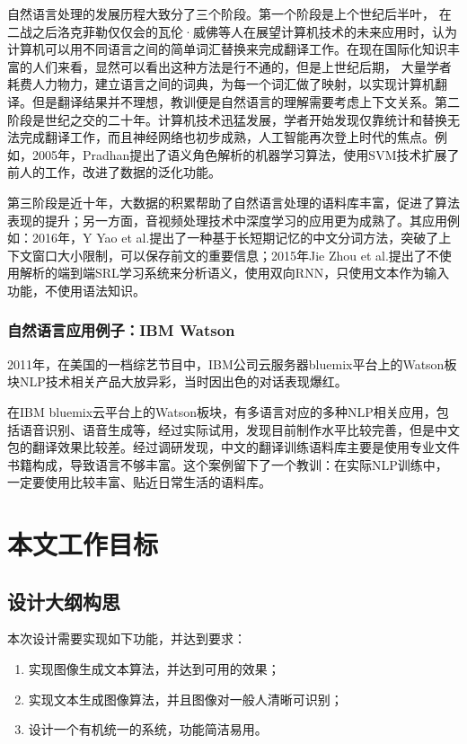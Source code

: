 自然语言处理的发展历程大致分了三个阶段。第一个阶段是上个世纪后半叶，
在二战之后洛克菲勒仅仅会的瓦伦·威佛等人在展望计算机技术的未来应用时，认为计算机可以用不同语言之间的简单词汇替换来完成翻译工作。在现在国际化知识丰富的人们来看，显然可以看出这种方法是行不通的，但是上世纪后期，
大量学者耗费人力物力，建立语言之间的词典，为每一个词汇做了映射，以实现计算机翻译。但是翻译结果并不理想，教训便是自然语言的理解需要考虑上下文关系。第二阶段是世纪之交的二十年。计算机技术迅猛发展，学者开始发现仅靠统计和替换无法完成翻译工作，而且神经网络也初步成熟，人工智能再次登上时代的焦点。例如，2005年，Pradhan提出了语义角色解析的机器学习算法，使用SVM技术扩展了前人的工作，改进了数据的泛化功能。

第三阶段是近十年，大数据的积累帮助了自然语言处理的语料库丰富，促进了算法表现的提升；另一方面，音视频处理技术中深度学习的应用更为成熟了。其应用例如：2016年，Y Yao et al.提出了一种基于长短期记忆的中文分词方法，突破了上下文窗口大小限制，可以保存前文的重要信息；2015年Jie Zhou et al.提出了不使用解析的端到端SRL学习系统来分析语义，使用双向RNN，只使用文本作为输入功能，不使用语法知识。

\subsubsection{自然语言应用例子：IBM Watson}
2011年，在美国的一档综艺节目中，IBM公司云服务器bluemix平台上的Watson板块NLP技术相关产品大放异彩，当时因出色的对话表现爆红。

在IBM bluemix云平台上的Watson板块，有多语言对应的多种NLP相关应用，包括语音识别、语音生成等，经过实际试用，发现目前制作水平比较完善，但是中文包的翻译效果比较差。经过调研发现，中文的翻译训练语料库主要是使用专业文件书籍构成，导致语言不够丰富。这个案例留下了一个教训：在实际NLP训练中，一定要使用比较丰富、贴近日常生活的语料库。

\section{本文工作目标}
\subsection{设计大纲构思}
本次设计需要实现如下功能，并达到要求：
\begin{enumerate}[fullwidth,itemindent=2em,label=\arabic*.]
    \item 实现图像生成文本算法，并达到可用的效果；
    \item 实现文本生成图像算法，并且图像对一般人清晰可识别；
    \item 设计一个有机统一的系统，功能简洁易用。
\end{enumerate}

